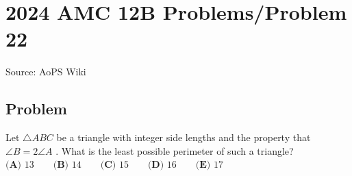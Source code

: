 \documentclass[12pt]{article}
\begin{document}
\section*{{2024 AMC 12B Problems/Problem 22}}
Source: AoPS Wiki

\subsection*{Problem}
Let $\triangle{ABC}$ be a triangle with integer side lengths and the property that $\angle{B} = 2\angle{A}$ . What is the least possible perimeter of such a triangle? $\textbf{(A) }13 \qquad \textbf{(B) }14 \qquad \textbf{(C) }15 \qquad \textbf{(D) }16 \qquad \textbf{(E) }17 \qquad$
\end{document}

